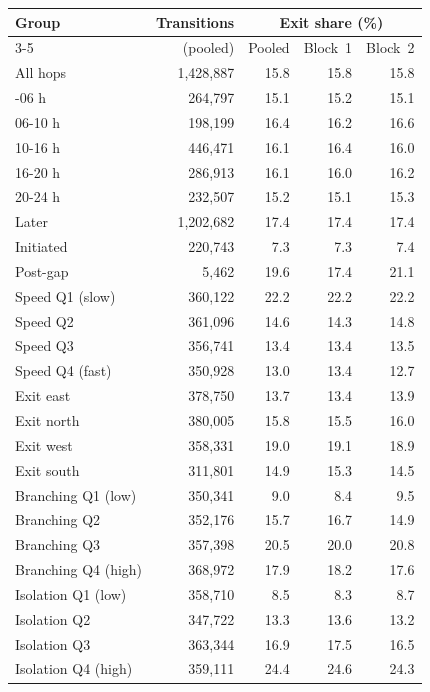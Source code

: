 \setlength{\tabcolsep}{3.4pt}
\begin{tabular}{@{}lrrrr@{}}
\toprule
Group & Transitions & \multicolumn{3}{c}{Exit share (\%)} \\
\cmidrule(l){3-5}
 & (pooled) & Pooled & Block~1 & Block~2 \\
\midrule
All hops & 1{,}428{,}887 & 15.8 & 15.8 & 15.8 \\
\addlinespace
00-06 h & 264{,}797 & 15.1 & 15.2 & 15.1 \\
06-10 h & 198{,}199 & 16.4 & 16.2 & 16.6 \\
10-16 h & 446{,}471 & 16.1 & 16.4 & 16.0 \\
16-20 h & 286{,}913 & 16.1 & 16.0 & 16.2 \\
20-24 h & 232{,}507 & 15.2 & 15.1 & 15.3 \\
\addlinespace
Later & 1{,}202{,}682 & 17.4 & 17.4 & 17.4 \\
Initiated & 220{,}743 & 7.3 & 7.3 & 7.4 \\
Post-gap & 5{,}462 & 19.6 & 17.4 & 21.1 \\
\addlinespace
Speed Q1 (slow) & 360{,}122 & 22.2 & 22.2 & 22.2 \\
Speed Q2 & 361{,}096 & 14.6 & 14.3 & 14.8 \\
Speed Q3 & 356{,}741 & 13.4 & 13.4 & 13.5 \\
Speed Q4 (fast) & 350{,}928 & 13.0 & 13.4 & 12.7 \\
\addlinespace
Exit east & 378{,}750 & 13.7 & 13.4 & 13.9 \\
Exit north & 380{,}005 & 15.8 & 15.5 & 16.0 \\
Exit west & 358{,}331 & 19.0 & 19.1 & 18.9 \\
Exit south & 311{,}801 & 14.9 & 15.3 & 14.5 \\
\addlinespace
Branching Q1 (low) & 350{,}341 & 9.0 & 8.4 & 9.5 \\
Branching Q2 & 352{,}176 & 15.7 & 16.7 & 14.9 \\
Branching Q3 & 357{,}398 & 20.5 & 20.0 & 20.8 \\
Branching Q4 (high) & 368{,}972 & 17.9 & 18.2 & 17.6 \\
\addlinespace
Isolation Q1 (low) & 358{,}710 & 8.5 & 8.3 & 8.7 \\
Isolation Q2 & 347{,}722 & 13.3 & 13.6 & 13.2 \\
Isolation Q3 & 363{,}344 & 16.9 & 17.5 & 16.5 \\
Isolation Q4 (high) & 359{,}111 & 24.4 & 24.6 & 24.3 \\
\bottomrule
\end{tabular}
